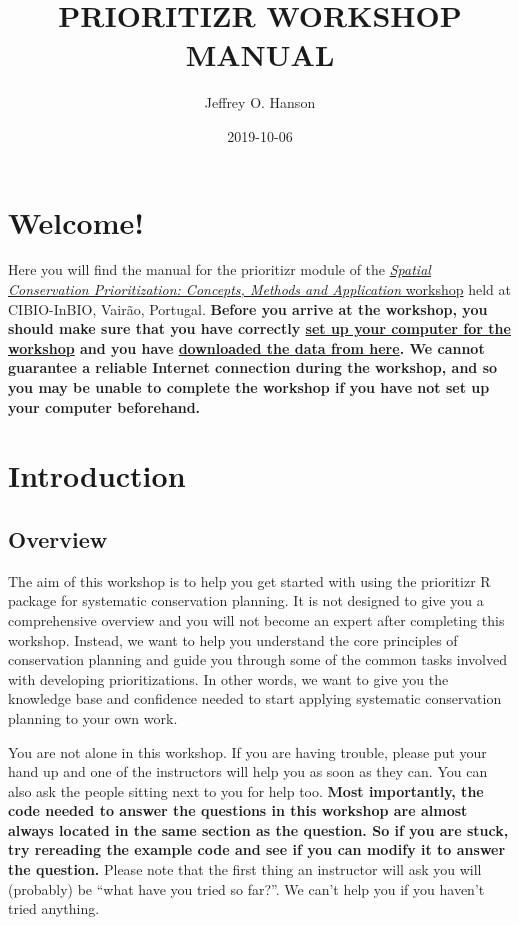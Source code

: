 \documentclass[12pt,]{book}
\title{PRIORITIZR WORKSHOP MANUAL}
\author{Jeffrey O. Hanson}
\date{2019-10-06}
\begin{document}
\maketitle

{
\hypersetup{linkcolor=black}
\setcounter{tocdepth}{0}
\tableofcontents
}
\chapter{Welcome!}\label{welcome}

Here you will find the manual for the prioritizr module of the
\href{https://cibio.up.pt/workshops--courses/details/advanced-course-spatial-conservation-prioritization-}{\emph{Spatial
Conservation Prioritization: Concepts, Methods and Application}
workshop} held at CIBIO-InBIO, Vairão, Portugal. \textbf{Before you
arrive at the workshop, you should make sure that you have correctly
\protect\hyperlink{setup}{set up your computer for the workshop} and you
have
\href{https://github.com/prioritizr/cibio-workshop/raw/master/data.zip}{downloaded
the data from here}. We cannot guarantee a reliable Internet connection
during the workshop, and so you may be unable to complete the workshop
if you have not set up your computer beforehand.}

\chapter{Introduction}\label{introduction}

\section{Overview}\label{overview}

The aim of this workshop is to help you get started with using the
prioritizr R package for systematic conservation planning. It is not
designed to give you a comprehensive overview and you will not become an
expert after completing this workshop. Instead, we want to help you
understand the core principles of conservation planning and guide you
through some of the common tasks involved with developing
prioritizations. In other words, we want to give you the knowledge base
and confidence needed to start applying systematic conservation planning
to your own work.

You are not alone in this workshop. If you are having trouble, please
put your hand up and one of the instructors will help you as soon as
they can. You can also ask the people sitting next to you for help too.
\textbf{Most importantly, the code needed to answer the questions in
this workshop are almost always located in the same section as the
question. So if you are stuck, try rereading the example code and see if
you can modify it to answer the question.} Please note that the first
thing an instructor will ask you will (probably) be ``what have you
tried so far?''. We can't help you if you haven't tried anything.
\end{document}
